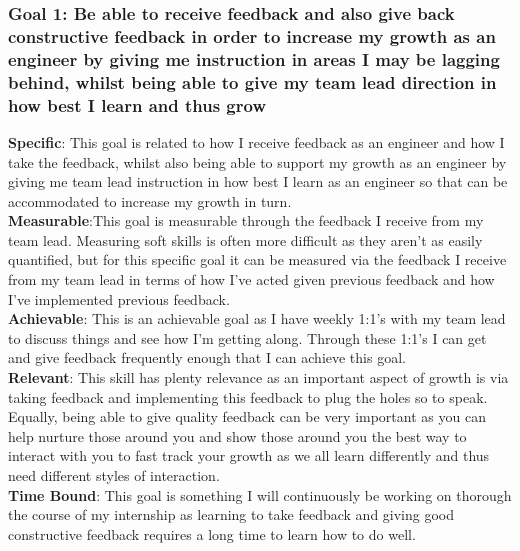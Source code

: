 \documentclass[12pt]{article} %
\begin{document}
\subsubsection{Goal 1: Be able to receive feedback and also give back constructive feedback in order to increase my growth as an engineer by giving me instruction in areas I may be lagging behind, whilst being able to give my team lead direction in how best I learn and thus grow}
\textbf{Specific}: This goal is related to how I receive feedback as an engineer and how I take the feedback,  whilst also being able to support my growth as an engineer by giving me team lead instruction in how best I learn as an engineer so that can be accommodated to increase my growth in turn. 
\\ \textbf{Measurable}:This goal is measurable through the feedback I receive from my team lead.  Measuring soft skills is often more difficult as they aren't as easily quantified,  but for this specific goal it can be measured via the feedback I receive from my team lead in terms of how I've acted given previous feedback and how I've implemented previous feedback.
\\ \textbf{Achievable}: This is an achievable goal as I have weekly 1:1's with my team lead to discuss things and see how I'm getting along.  Through these 1:1's I can get and give feedback frequently enough that I can achieve this goal. 
\\ \textbf{Relevant}: This skill has plenty relevance as an important aspect of growth is via taking feedback and implementing this feedback to plug the holes so to speak.  Equally,  being able to give quality feedback can be very important as you can help nurture those around you and show those around you the best way to interact with you to fast track your growth as we all learn differently and thus need different styles of interaction.
\\ \textbf{Time Bound}: This goal is something I will continuously be working on thorough the course of my internship as learning to take feedback and giving good constructive feedback requires a long time to learn how to do well. 
\end{document}
